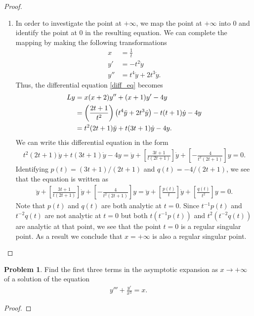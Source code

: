 \documentclass[12pt]{article}
\theoremstyle{definition}
\newtheorem{problem}{Problem}
\begin{document}
\begin{proof}
  \begin{enumerate}
    \item In order to investigate the point at $+\infty$, we map the point at
      $+\infty$ into $0$ and identify the point at $0$ in the resulting equation.
      We can complete the mapping by making the following transformations
      \begin{align*}
        x &= \frac{1}{t} \\
        y' &= -t^2 \dot{y} \\
        y'' &= t^4 \ddot{y} + 2t^3 \dot{y}.
      \end{align*}
      Thus, the differential equation \eqref{diff_eq} becomes
      \begin{align*}
        Ly &= x(x+2)y'' + (x+1)y' - 4y \notag \\
        &= \left(\frac{2t+1}{t^2}\right)\left(t^4 \ddot{y} + 2t^3 \dot{y}\right) -t(t + 1)\dot{y} - 4y \notag \\
        &= t^2(2t+1)\ddot{y} + t(3t+1)\dot{y} - 4y.
      \end{align*}
      We can write this differential equation in the form
      \begin{align}\label{diff_eq_mapped}
        t^2(2t+1)\ddot{y} + t(3t+1)\dot{y} - 4y = \ddot{y} + \left[\frac{3t+1}{t(2t+1)}\right]\dot{y} + \left[-\frac{4}{t^2(2t+1)}\right]y=0.
      \end{align}
      Identifying $p(t) = (3t+1)/(2t+1)$ and $q(t) = -4/(2t+1)$, we see that the equation is written as
      \begin{align*}
        \ddot{y} + \left[\frac{3t+1}{t(2t+1)}\right]\dot{y} + \left[-\frac{4}{t^2(2t+1)}\right]y = \ddot{y} + \left[\frac{p(t)}{t}\right]\dot{y} + \left[\frac{q(t)}{t^2}\right]y = 0.
      \end{align*}
      Note that $p(t)$ and $q(t)$ are both analytic at $t=0$.
      Since $t^{-1}p(t)$ and $t^{-2}q(t)$ are not analytic at $t=0$ but both
      $t(t^{-1}p(t))$ and $t^2(t^{-2}q(t))$ are analytic at that point, we
      see that the point $t=0$ is a regular singular point. As a result
      we conclude that $x=+\infty$ is also a regular singular point.

  \end{enumerate}
\end{proof}
\newpage


\begin{problem}
  Find the first three terms in the asymptotic expansion as $x \to +\infty$
  of a solution of the equation
  \begin{align*}
    y''' + \frac{y'}{x^3} = x.
  \end{align*}
\end{problem}

\begin{proof}
\end{proof}
\end{document}
